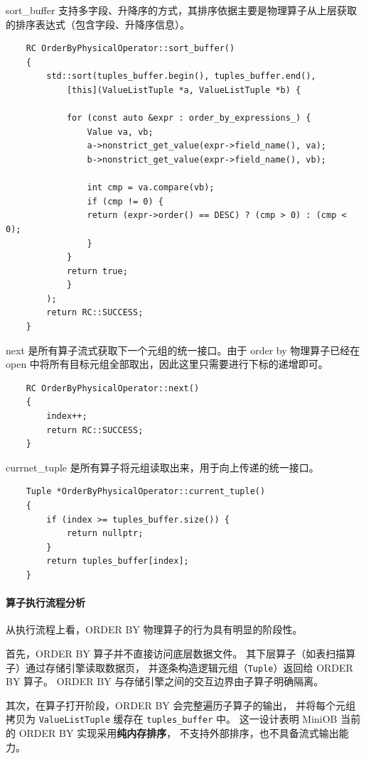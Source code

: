 \documentclass[a4paper, 12pt]{article}
\begin{document}
sort\_buffer 支持多字段、升降序的方式，其排序依据主要是物理算子从上层获取的排序表达式（包含字段、升降序信息）。

\begin{lstlisting}
    RC OrderByPhysicalOperator::sort_buffer()
    {
        std::sort(tuples_buffer.begin(), tuples_buffer.end(),
            [this](ValueListTuple *a, ValueListTuple *b) {

            for (const auto &expr : order_by_expressions_) {
                Value va, vb;
                a->nonstrict_get_value(expr->field_name(), va);
                b->nonstrict_get_value(expr->field_name(), vb);

                int cmp = va.compare(vb);
                if (cmp != 0) {
                return (expr->order() == DESC) ? (cmp > 0) : (cmp < 0);
                }
            }
            return true;
            }
        );
        return RC::SUCCESS;
    }
\end{lstlisting}

next 是所有算子流式获取下一个元组的统一接口。由于 order by 物理算子已经在 open 中将所有目标元组全部取出，因此这里只需要进行下标的递增即可。

\begin{lstlisting}
    RC OrderByPhysicalOperator::next()
    {
        index++;
        return RC::SUCCESS;
    }
\end{lstlisting}

currnet\_tuple 是所有算子将元组读取出来，用于向上传递的统一接口。

\begin{lstlisting}
    Tuple *OrderByPhysicalOperator::current_tuple()
    {
        if (index >= tuples_buffer.size()) {
            return nullptr;
        }
        return tuples_buffer[index];
    }
\end{lstlisting}

\paragraph{\heiti 算子执行流程分析}

从执行流程上看，ORDER BY 物理算子的行为具有明显的阶段性。

首先，ORDER BY 算子并不直接访问底层数据文件。
其下层算子（如表扫描算子）通过存储引擎读取数据页，
并逐条构造逻辑元组（\texttt{Tuple}）返回给 ORDER BY 算子。
ORDER BY 与存储引擎之间的交互边界由子算子明确隔离。

其次，在算子打开阶段，ORDER BY 会完整遍历子算子的输出，
并将每个元组拷贝为 \texttt{ValueListTuple} 缓存在
\texttt{tuples\_buffer} 中。
这一设计表明 MiniOB 当前的 ORDER BY 实现采用\textbf{纯内存排序}，
不支持外部排序，也不具备流式输出能力。
\end{document}
